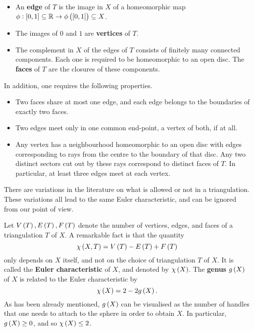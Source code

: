 \begin{itemize}
\item An \textbf{edge} of $ T $ is the image in $ X $ of a homeomorphic map $ \phi : \sbr{0, 1} \subseteq \R \to \phi\br{\sbr{0, 1}} \subseteq X $.
\item The images of $ 0 $ and $ 1 $ are \textbf{vertices} of $ T $.
\item The complement in $ X $ of the edges of $ T $ consists of finitely many connected components. Each one is required to be homeomorphic to an open disc. The \textbf{faces} of $ T $ are the closures of these components.
\end{itemize}
In addition, one requires the following properties.
\begin{itemize}
\item Two faces share at most one edge, and each edge belongs to the boundaries of exactly two faces.
\item Two edges meet only in one common end-point, a vertex of both, if at all.
\item Any vertex has a neighbourhood homeomorphic to an open disc with edges corresponding to rays from the centre to the boundary of that disc. Any two distinct sectors cut out by these rays correspond to distinct faces of $ T $. In particular, at least three edges meet at each vertex.
\end{itemize}

\begin{remark}
There are variations in the literature on what is allowed or not in a triangulation. These variations all lead to the same Euler characteristic, and can be ignored from our point of view.
\end{remark}

Let $ V\br{T}, E\br{T}, F\br{T} $ denote the number of vertices, edges, and faces of a triangulation $ T $ of $ X $. A remarkable fact is that the quantity
$$ \chi\br{X, T} = V\br{T} - E\br{T} + F\br{T} $$
only depends on $ X $ itself, and not on the choice of triangulation $ T $ of $ X $. It is called the \textbf{Euler characteristic} of $ X $, and denoted by $ \chi\br{X} $. The \textbf{genus} $ g\br{X} $ of $ X $ is related to the Euler characteristic by
$$ \chi\br{X} = 2 - 2g\br{X}. $$
As has been already mentioned, $ g\br{X} $ can be visualised as the number of handles that one needs to attach to the sphere in order to obtain $ X $. In particular, $ g\br{X} \ge 0 $, and so $ \chi\br{X} \le 2 $.

\pagebreak

